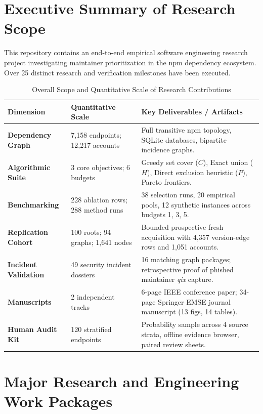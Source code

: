 \documentclass[11pt,a4paper]{article}
\begin{document}
\tableofcontents
\clearpage

\section{Executive Summary of Research Scope}

This repository contains an end-to-end empirical software engineering research project investigating maintainer prioritization in the npm dependency ecosystem. Over 25 distinct research and verification milestones have been executed.

\begin{table}[ht]
\centering
\small
\begin{tabularx}{\linewidth}{l p{4.2cm} X}
\toprule
\textbf{Dimension} & \textbf{Quantitative Scale} & \textbf{Key Deliverables / Artifacts} \\
\midrule
\textbf{Dependency Graph} & 7,158 endpoints; 12,217 accounts & Full transitive npm topology, SQLite databases, bipartite incidence graphs. \\
\addlinespace
\textbf{Algorithmic Suite} & 3 core objectives; 6 budgets & Greedy set cover ($C$), Exact union ($H$), Direct exclusion heuristic ($P$), Pareto frontiers. \\
\addlinespace
\textbf{Benchmarking} & 228 ablation rows; 288 method runs & 38 selection runs, 20 empirical pools, 12 synthetic instances across budgets 1, 3, 5. \\
\addlinespace
\textbf{Replication Cohort} & 100 roots; 94 graphs; 1,641 nodes & Bounded prospective fresh acquisition with 4,357 version-edge rows and 1,051 accounts. \\
\addlinespace
\textbf{Incident Validation} & 49 security incident dossiers & 16 matching graph packages; retrospective proof of phished maintainer \textit{qix} capture. \\
\addlinespace
\textbf{Manuscripts} & 2 independent tracks & 6-page IEEE conference paper; 34-page Springer EMSE journal manuscript (13 figs, 14 tables). \\
\addlinespace
\textbf{Human Audit Kit} & 120 stratified endpoints & Probability sample across 4 source strata, offline evidence browser, paired review sheets. \\
\bottomrule
\end{tabularx}
\caption{Overall Scope and Quantitative Scale of Research Contributions}
\end{table}

\section{Major Research and Engineering Work Packages}
\end{document}
